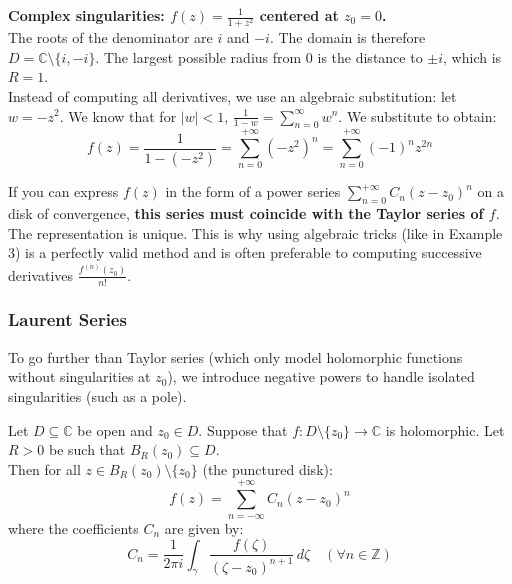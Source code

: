 \begin{example}
\textbf{Complex singularities: $f(z) = \frac{1}{1 + z^2}$ centered at $z_0 = 0$.} \\
The roots of the denominator are $i$ and $-i$. The domain is therefore $D = \mathbb{C} \setminus \{i, -i\}$. The largest possible radius from $0$ is the distance to $\pm i$, which is $R = 1$. \\
Instead of computing all derivatives, we use an algebraic substitution: let $w = -z^2$. We know that for $|w| < 1$, $\frac{1}{1 - w} = \sum_{n=0}^{\infty} w^n$. We substitute to obtain:
$$f(z) = \frac{1}{1 - (-z^2)} = \sum_{n=0}^{+\infty} (-z^2)^n = \sum_{n=0}^{+\infty} (-1)^n z^{2n}$$
\end{example}

\begin{verification}
If you can express $f(z)$ in the form of a power series $\sum_{n=0}^{+\infty} C_n (z - z_0)^n$ on a disk of convergence, \textbf{this series must coincide with the Taylor series of $f$}. The representation is unique. This is why using algebraic tricks (like in Example 3) is a perfectly valid method and is often preferable to computing successive derivatives $\frac{f^{(n)}(z_0)}{n!}$.
\end{verification}

\subsubsection{Laurent Series}

To go further than Taylor series (which only model holomorphic functions without singularities at $z_0$), we introduce negative powers to handle isolated singularities (such as a pole).

\begin{theorem}
Let $D \subseteq \mathbb{C}$ be open and $z_0 \in D$. Suppose that $f : D \setminus \{z_0\} \rightarrow \mathbb{C}$ is holomorphic. Let $R > 0$ be such that $B_R(z_0) \subseteq D$. \\
Then for all $z \in B_R(z_0) \setminus \{z_0\}$ (the punctured disk):
\begin{equation}
f(z) = \sum_{n=-\infty}^{+\infty} C_n (z - z_0)^n
\end{equation}
where the coefficients $C_n$ are given by:
\begin{equation}
C_n = \frac{1}{2\pi i} \int_{\gamma} \frac{f(\zeta)}{(\zeta - z_0)^{n+1}} \, d\zeta \quad (\forall n \in \mathbb{Z})
\end{equation}
\end{theorem}

